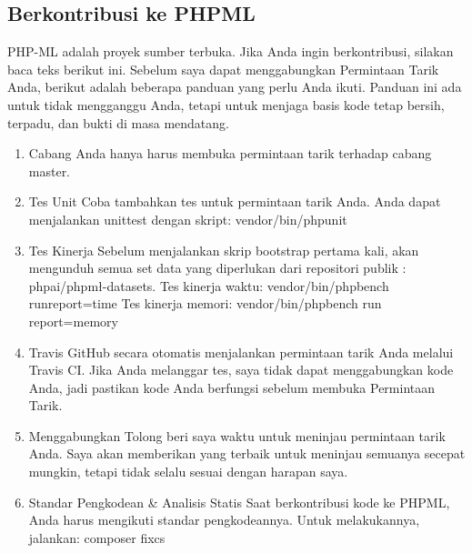 \subsection{Berkontribusi ke PHP\-ML}
\par PHP-ML adalah proyek sumber terbuka. Jika Anda ingin berkontribusi, silakan baca teks berikut ini. Sebelum saya dapat menggabungkan Permintaan Tarik Anda, berikut adalah beberapa panduan yang perlu Anda ikuti. Panduan ini ada untuk tidak mengganggu Anda, tetapi untuk menjaga basis kode tetap bersih, terpadu, dan bukti di masa mendatang.
\begin{enumerate}
\item Cabang
Anda hanya harus membuka permintaan tarik terhadap cabang master.
\item Tes Unit
Coba tambahkan tes untuk permintaan tarik Anda. Anda dapat menjalankan unit\-test dengan skript:
	vendor/bin/phpunit
\item Tes Kinerja
Sebelum menjalankan skrip bootstrap pertama kali, akan mengunduh semua set data yang diperlukan dari repositori publik : php\-ai/php\-m\l-datasets.
Tes kinerja waktu:
vendor/bin/phpbench run\-\-report=time
Tes kinerja memori:
vendor/bin/phpbench run \-\-report=memory
\item Travis
GitHub secara otomatis menjalankan permintaan tarik Anda melalui Travis CI. Jika Anda melanggar tes, saya tidak dapat menggabungkan kode Anda, jadi pastikan kode Anda berfungsi sebelum membuka Permintaan Tarik.
\item Menggabungkan
Tolong beri saya waktu untuk meninjau permintaan tarik Anda. Saya akan memberikan yang terbaik untuk meninjau semuanya secepat mungkin, tetapi tidak selalu sesuai dengan harapan saya.
\item Standar Pengkodean \& Analisis Statis
Saat berkontribusi kode ke PHP\-ML, Anda harus mengikuti standar pengkodeannya. Untuk melakukannya, jalankan:
	composer fix\-cs
\end{enumerate}

















